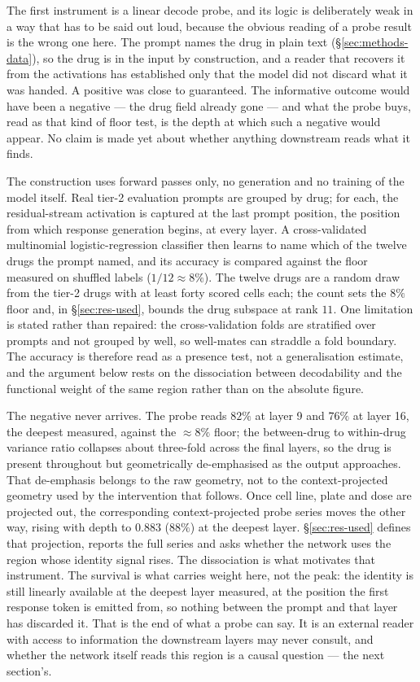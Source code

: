The first instrument is a linear decode probe, and its logic is deliberately weak in a way that has
to be said out loud, because the obvious reading of a probe result is the wrong one here. The prompt
names the drug in plain text (\S\ref{sec:methods-data}), so the drug is in the input by
construction, and a reader that recovers it from the activations has established only that the model
did not discard what it was handed. A positive was close to guaranteed. The informative outcome
would have been a negative --- the drug field already gone --- and what the probe buys, read as that
kind of floor test, is the depth at which such a negative would appear. No claim is made yet about
whether anything downstream reads what it finds.

The construction uses forward passes only, no generation and no training of the model itself. Real tier-2 evaluation
prompts are grouped by drug; for each, the residual-stream activation is captured at the last prompt
position, the position from which response generation begins, at every layer. A
cross-validated multinomial logistic-regression classifier then learns to name which of the twelve
drugs the prompt named, and its accuracy is compared against the floor measured on shuffled labels
($1/12 \approx 8\%$). The twelve drugs are a random draw from the tier-2 drugs with at least forty
scored cells each; the count sets the $8\%$ floor and, in \S\ref{sec:res-used}, bounds the drug
subspace at rank $11$. One limitation is stated rather than repaired: the cross-validation folds are
stratified over prompts and not grouped by well, so well-mates can straddle a fold boundary. The
accuracy is therefore read as a presence test, not a generalisation estimate, and the argument below
rests on the dissociation between decodability and the functional weight of the same region rather
than on the absolute figure.

The negative never arrives. The probe reads $82\%$ at layer 9 and $76\%$ at layer 16, the deepest
measured, against the $\approx 8\%$ floor; the between-drug to within-drug variance ratio collapses
about three-fold across the final layers, so the drug is present throughout but geometrically
de-emphasised as the output approaches. That de-emphasis belongs to the raw geometry, not to the
context-projected geometry used by the intervention that follows. Once cell line, plate and dose are
projected out, the corresponding context-projected probe series moves the other way, rising with
depth to $0.883$ ($88\%$) at the deepest layer. \S\ref{sec:res-used} defines that projection, reports
the full series and asks whether the network uses the region whose identity signal rises. The
dissociation is what motivates that instrument. The survival is what carries
weight here, not the peak: the
identity is still linearly available at the deepest layer measured, at the position the first
response token is emitted from, so nothing between the prompt and that layer has discarded it. That
is the end of what a probe can say. It is an external reader with access to information the
downstream layers may never consult, and whether the network itself reads this region is a causal
question --- the next section's.

